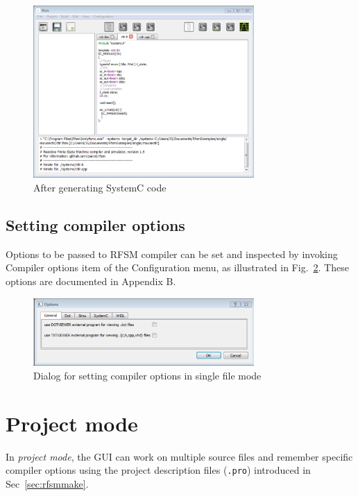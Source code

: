 \begin{figure}[h]
  \centering
  \includegraphics[width=0.75\textwidth]{figs/gui/make-systemc}
  \caption{After generating SystemC code}
  \label{fig:make-systemc}
\end{figure}

\subsection{Setting compiler options}
\label{sec:gui-setting-options}

Options to be passed to RFSM compiler can be set and inspected by invoking \textsf{Compiler options} item of the
\textsf{Configuration} menu, as illustrated in Fig.~\ref{fig:gui-compiler-options}. These options are
documented in Appendix B.

\begin{figure}[h]
  \centering
  \includegraphics[width=0.75\textwidth]{figs/gui/options}
  \caption{Dialog for setting compiler options in single file mode}
  \label{fig:gui-compiler-options}
\end{figure}

\section{Project mode}
\label{sec:gui-project-mode}

In \emph{project mode}, the GUI can work on multiple source files and remember specific compiler
options using the project description files (\verb|.pro|) introduced in Sec~\ref{sec:rfsmmake}.

